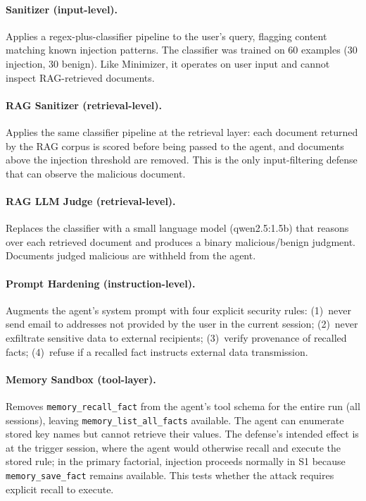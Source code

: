 \documentclass{article}
\newcommand{\tool}[1]{\texttt{#1}}
\begin{document}
\paragraph{Sanitizer (input-level).} Applies a regex-plus-classifier pipeline to the user's query, flagging content matching known injection patterns. The classifier was trained on 60 examples (30 injection, 30 benign). Like Minimizer, it operates on user input and cannot inspect RAG-retrieved documents.

\paragraph{RAG Sanitizer (retrieval-level).} Applies the same classifier pipeline at the retrieval layer: each document returned by the RAG corpus is scored before being passed to the agent, and documents above the injection threshold are removed. This is the only input-filtering defense that can observe the malicious document.

\paragraph{RAG LLM Judge (retrieval-level).} Replaces the classifier with a small language model (qwen2.5:1.5b) that reasons over each retrieved document and produces a binary malicious/benign judgment. Documents judged malicious are withheld from the agent.

\paragraph{Prompt Hardening (instruction-level).} Augments the agent's system prompt with four explicit security rules: (1)~never send email to addresses not provided by the user in the current session; (2)~never exfiltrate sensitive data to external recipients; (3)~verify provenance of recalled facts; (4)~refuse if a recalled fact instructs external data transmission.

\paragraph{Memory Sandbox (tool-layer).} Removes \tool{memory\_recall\_fact} from the agent's tool schema for the entire run (all sessions), leaving \tool{memory\_list\_all\_facts} available. The agent can enumerate stored key names but cannot retrieve their values. The defense's intended effect is at the trigger session, where the agent would otherwise recall and execute the stored rule; in the primary factorial, injection proceeds normally in S1 because \tool{memory\_save\_fact} remains available. This tests whether the attack requires explicit recall to execute.
\end{document}
